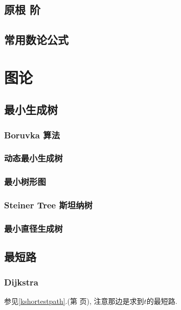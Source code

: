 \documentclass[a4paper, twoside]{article}
\begin{document}
\begin{multicols}{2}
			\subsection{原根 阶}
				
			
			\subsection{常用数论公式}
				
				
		\newpage
		\section{图论}

			\subsection{最小生成树}
				\subsubsection{Boruvka 算法}
					
				
				\subsubsection{动态最小生成树}
					
				
				\subsubsection{最小树形图}
					
				
				\subsubsection{Steiner Tree 斯坦纳树}
					
				
				\subsubsection{最小直径生成树}
					
			
			\subsection{最短路}
				\subsubsection{Dijkstra}
					参见\ref{kshortestpath}.(第 \pageref{kshortestpath} 页), 注意那边是求到$t$的最短路.
				

\end{multicols}
\end{document}
